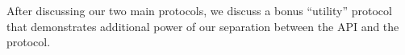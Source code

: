 
After discussing our two main protocols, we discuss
a bonus ``utility'' protocol that demonstrates
additional power of our separation
between the API and the protocol.











